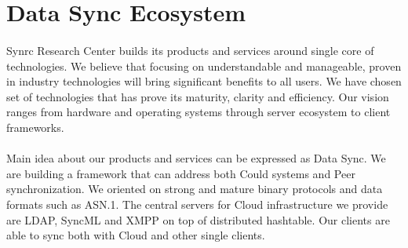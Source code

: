 \documentclass[11pt]{article}
\begin{document}

\section*{Data Sync Ecosystem}
\paragraph{}
Synrc Research Center builds its products and services around single core of technologies.
We believe that focusing on understandable and manageable, proven in industry technologies
will bring significant benefits to all users. We have chosen set of technologies that
has prove its maturity, clarity and efficiency. Our vision ranges from hardware and operating systems through
server ecosystem to client frameworks.
\paragraph{}
Main idea about our products and services can be expressed as Data Sync. We are building a framework
that can address both Could systems and Peer synchronization. We oriented on strong and mature
binary protocols and data formats such as ASN.1. The central servers for Cloud infrastructure we provide are LDAP, SyncML
and XMPP on top of distributed hashtable. Our clients are able to sync both with Cloud and other single clients.

\end{document}
